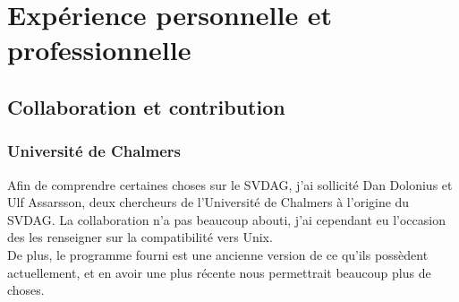 \documentclass[12pt,a4paper,twoside]{article}
\begin{document}
    \begin{figure}[H]
    \end{figure}

    \section{Expérience personnelle et professionnelle}
    \subsection{Collaboration et contribution}

    \subsubsection{Université de Chalmers}

    Afin de comprendre certaines choses sur le SVDAG, j'ai sollicité Dan Dolonius et Ulf Assarsson, deux chercheurs de l'Université de Chalmers à l'origine du SVDAG.
    La collaboration n'a pas beaucoup abouti, j'ai cependant eu l'occasion des les renseigner sur la compatibilité vers Unix.\\
    De plus, le programme fourni est une ancienne version de ce qu'ils possèdent actuellement, et en avoir une plus récente
    nous permettrait beaucoup plus de choses.
\end{document}
